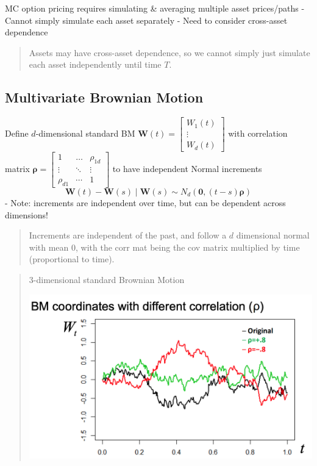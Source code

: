 \documentclass[
  oneside]{book}
\begin{document}
MC option pricing requires simulating \& averaging multiple asset prices/paths
- Cannot simply simulate each asset separately
- Need to consider cross-asset dependence

\begin{quote}
Assets may have cross-asset dependence, so we cannot simply just simulate each asset independently until time \(T\).
\end{quote}

\hypertarget{multivariate-brownian-motion}{%
\subsection{Multivariate Brownian Motion}\label{multivariate-brownian-motion}}

Define \(d\)-dimensional standard BM
\(\mathbf{W}(t)=\left[\begin{array}{c}W_1(t) \\ \vdots \\ W_d(t)\end{array}\right]\) with correlation matrix \(\boldsymbol{\rho}=\left[\begin{array}{ccc}1 & \ldots & \rho_{1 d} \\ \vdots & \ddots & \vdots \\ \rho_{d 1} & \cdots & 1\end{array}\right]\)
to have independent Normal increments
\[
\mathbf{W}(t)-\mathbf{W}(s) \mid \mathbf{W}(s) \sim N_d(\mathbf{0},(t-s) \boldsymbol{\rho})
\]
- Note: increments are independent over time, but can be dependent across dimensions!

\begin{quote}
Increments are independent of the past, and follow a \(d\) dimensional normal with mean 0, with the corr mat being the cov matrix multiplied by time (proportional to time).
\end{quote}

\begin{quote}
3-dimensional standard Brownian Motion

\includegraphics{Notes/Obsidian-Attachments/10-Simulation.png}
\end{quote}
\end{document}
